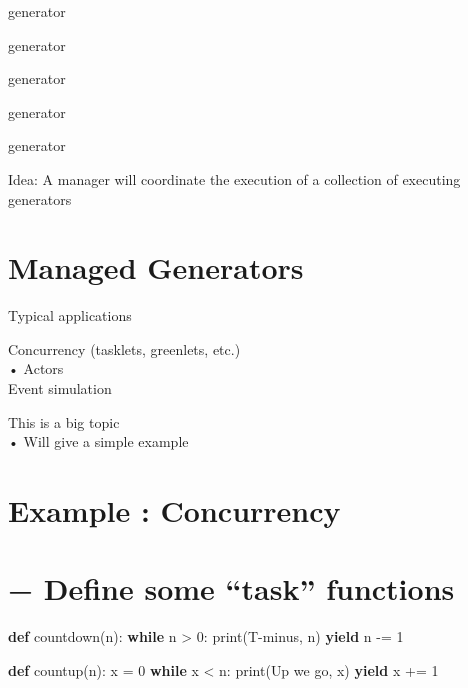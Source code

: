 \documentclass[
  letterpaper,
  DIV=11,
  numbers=noendperiod]{scrreprt}
\newenvironment{Shaded}{\begin{snugshade}}{\end{snugshade}}
\newcommand{\BuiltInTok}[1]{\textcolor[rgb]{0.00,0.23,0.31}{#1}}
\newcommand{\ControlFlowTok}[1]{\textcolor[rgb]{0.00,0.23,0.31}{\textbf{#1}}}
\newcommand{\DecValTok}[1]{\textcolor[rgb]{0.68,0.00,0.00}{#1}}
\newcommand{\KeywordTok}[1]{\textcolor[rgb]{0.00,0.23,0.31}{\textbf{#1}}}
\newcommand{\NormalTok}[1]{\textcolor[rgb]{0.00,0.23,0.31}{#1}}
\newcommand{\OperatorTok}[1]{\textcolor[rgb]{0.37,0.37,0.37}{#1}}
\newcommand{\StringTok}[1]{\textcolor[rgb]{0.13,0.47,0.30}{#1}}
\begin{document}
generator

generator

generator

generator

generator

Idea: A manager will coordinate the execution of a collection of
executing generators


\chapter{Managed Generators}\label{managed-generators-2}

Typical applications

Concurrency (tasklets, greenlets, etc.)\\
• Actors\\
Event simulation

This is a big topic\\
• Will give a simple example


\chapter{Example : Concurrency}\label{example-concurrency}


\chapter{− Define some ``task''
functions}\label{define-some-task-functions}

\begin{Shaded}
\begin{Highlighting}[]
\KeywordTok{def}\NormalTok{ countdown(n):}
    \ControlFlowTok{while}\NormalTok{ n }\OperatorTok{\textgreater{}} \DecValTok{0}\NormalTok{:}
        \BuiltInTok{print}\NormalTok{(}\StringTok{\textquotesingle{}T{-}minus\textquotesingle{}}\NormalTok{, n)}
        \ControlFlowTok{yield}
\NormalTok{        n }\OperatorTok{{-}=} \DecValTok{1} 
\end{Highlighting}
\end{Shaded}

\begin{Shaded}
\begin{Highlighting}[]
\KeywordTok{def}\NormalTok{ countup(n):}
\NormalTok{    x }\OperatorTok{=} \DecValTok{0}
    \ControlFlowTok{while}\NormalTok{ x }\OperatorTok{\textless{}}\NormalTok{ n:}
        \BuiltInTok{print}\NormalTok{(}\StringTok{\textquotesingle{}Up we go\textquotesingle{}}\NormalTok{, x)}
        \ControlFlowTok{yield}
\NormalTok{        x }\OperatorTok{+=} \DecValTok{1} 
\end{Highlighting}
\end{Shaded}
\end{document}
